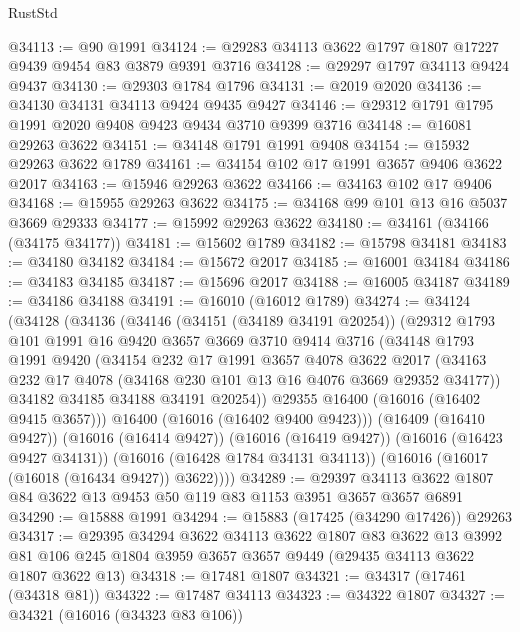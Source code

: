 \begin{lexlean}{RustStd}
\begin{coremodule}
@34113 := @90 @1991
@34124 := @29283 @34113 @3622 @1797 @1807 @17227 @9439 @9454 @83 @3879 @9391 @3716
@34128 := @29297 @1797 @34113 @9424 @9437
@34130 := @29303 @1784 @1796
@34131 := @2019 @2020
@34136 := @34130 @34131 @34113 @9424 @9435 @9427
@34146 := @29312 @1791 @1795 @1991 @2020 @9408 @9423 @9434 @3710 @9399 @3716
@34148 := @16081 @29263 @3622
@34151 := @34148 @1791 @1991 @9408
@34154 := @15932 @29263 @3622 @1789
@34161 := @34154 @102 @17 @1991 @3657 @9406 @3622 @2017
@34163 := @15946 @29263 @3622
@34166 := @34163 @102 @17 @9406
@34168 := @15955 @29263 @3622
@34175 := @34168 @99 @101 @13 @16 @5037 @3669 @29333
@34177 := @15992 @29263 @3622
@34180 := @34161 (@34166 (@34175 @34177))
@34181 := @15602 @1789
@34182 := @15798 @34181
@34183 := @34180 @34182
@34184 := @15672 @2017
@34185 := @16001 @34184
@34186 := @34183 @34185
@34187 := @15696 @2017
@34188 := @16005 @34187
@34189 := @34186 @34188
@34191 := @16010 (@16012 @1789)
@34274 := @34124
    (@34128
      (@34136
        (@34146
          (@34151 (@34189 @34191 @20254))
          (@29312
            @1793
            @101
            @1991
            @16
            @9420
            @3657
            @3669
            @3710
            @9414
            @3716
            (@34148
              @1793
              @1991
              @9420
              (@34154
                @232
                @17
                @1991
                @3657
                @4078
                @3622
                @2017
                (@34163 @232 @17 @4078 (@34168 @230 @101 @13 @16 @4076 @3669 @29352 @34177))
                @34182
                @34185
                @34188
                @34191
                @20254))
            @29355
            @16400
            (@16016 (@16402 @9415 @3657)))
          @16400
          (@16016 (@16402 @9400 @9423)))
        (@16409 (@16410 @9427))
        (@16016 (@16414 @9427))
        (@16016 (@16419 @9427))
        (@16016 (@16423 @9427 @34131))
        (@16016 (@16428 @1784 @34131 @34113))
        (@16016 (@16017 (@16018 (@16434 @9427)) @3622))))
@34289 := @29397 @34113 @3622 @1807 @84 @3622 @13 @9453 @50 @119 @83 @1153 @3951 @3657 @3657 @6891
@34290 := @15888 @1991
@34294 := @15883 (@17425 (@34290 @17426)) @29263
@34317 := @29395
    @34294
    @3622
    @34113
    @3622
    @1807
    @83
    @3622
    @13
    @3992
    @81
    @106
    @245
    @1804
    @3959
    @3657
    @3657
    @9449
    (@29435 @34113 @3622 @1807 @3622 @13)
@34318 := @17481 @1807
@34321 := @34317 (@17461 (@34318 @81))
@34322 := @17487 @34113
@34323 := @34322 @1807
@34327 := @34321 (@16016 (@34323 @83 @106))

\end{coremodule}
\end{lexlean}
